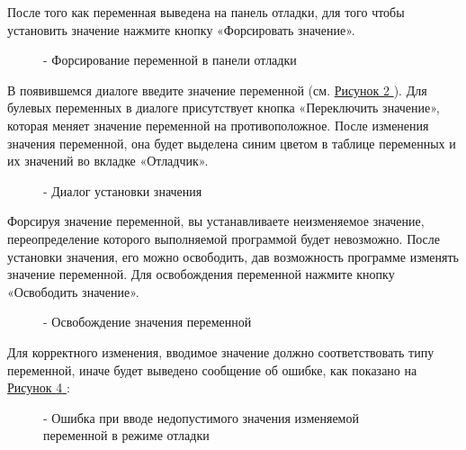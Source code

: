 \documentclass[letterpaper,10pt,russian]{sphinxmanual}
\begin{document}
После того как переменная выведена на панель отладки, для того чтобы
установить значение нажмите кнопку «Форсировать значение».
\begin{figure}[htbp]
\centering
\capstart

\noindent{}
\caption{- Форсирование переменной в панели отладки}\label{usage_guide/work_with_project:image216}\end{figure}

В появившемся диалоге введите значение переменной (см. \hyperref[usage_guide/work_with_project:image217]{Рисунок \ref{usage_guide/work_with_project:image217} }). Для
булевых переменных в диалоге присутствует кнопка «Переключить значение»,
которая меняет значение переменной на противоположное. После изменения
значения переменной, она будет выделена синим цветом в таблице
переменных и их значений во вкладке «Отладчик».
\begin{figure}[htbp]
\centering
\capstart

\noindent{}
\caption{- Диалог установки значения}\label{usage_guide/work_with_project:image217}\end{figure}

Форсируя значение переменной, вы устанавливаете неизменяемое значение,
переопределение которого выполняемой программой будет невозможно. После
установки значения, его можно освободить, дав возможность программе
изменять значение переменной. Для освобождения переменной нажмите кнопку
«Освободить значение».
\begin{figure}[htbp]
\centering
\capstart

\noindent{}
\caption{- Освобождение значения переменной}\label{usage_guide/work_with_project:image218}\end{figure}

Для корректного изменения, вводимое значение должно соответствовать типу
переменной, иначе будет выведено сообщение об ошибке, как показано
на \hyperref[usage_guide/work_with_project:image219]{Рисунок \ref{usage_guide/work_with_project:image219} }:
\begin{figure}[htbp]
\centering
\capstart

\noindent{}
\caption{- Ошибка при вводе недопустимого значения изменяемой переменной в режиме отладки}\label{usage_guide/work_with_project:image219}\end{figure}
\end{document}
